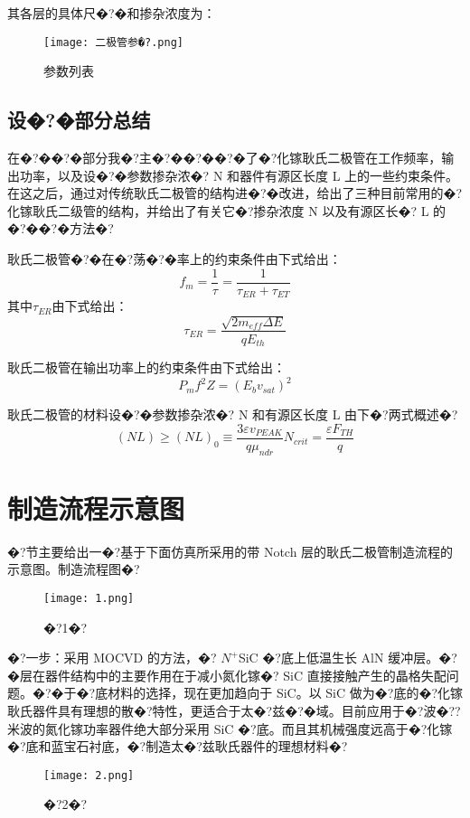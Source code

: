 \documentclass{zjureport}
\begin{document}
其各层的具体尺�?�和掺杂浓度为：
\begin{figure}[htbp]
	\centering
	\texttt{[image: 二极管参�?.png]}
	\caption{参数列表}
\end{figure}

\subsection{设�?�部分总结}
在�?��?�部分我�?主�?��?��?�了�?化镓耿氏二极管在工作频率，输出功率，以及设�?�参数掺杂浓�? N 和器件有源区长度 L 上的一些约束条件。在这之后，通过对传统耿氏二极管的结构进�?�改进，给出了三种目前常用的�?化镓耿氏二级管的结构，并给出了有关它�?掺杂浓度 N 以及有源区长�? L 的�?��?�方法�?

耿氏二极管�?�在�?荡�?�率上的约束条件由下式给出： 
\begin{equation}
	f_m=\frac{1}{\tau}=\frac{1}{\tau_{ER}+\tau_{ET}}
\end{equation}
其中$\tau_{ER}$由下式给出：
\begin{equation}
	\tau_{ER}=\frac{\sqrt{2m_{eff}\Delta E}}{qE_{th}}
\end{equation}

耿氏二极管在输出功率上的约束条件由下式给出：
\begin{equation}
	P_mf^2Z=(E_bv_{sat})^2
\end{equation}

耿氏二极管的材料设�?�参数掺杂浓�? N 和有源区长度 L 由下�?两式概述�?
\begin{equation}
	(NL)\geq(NL)_0\equiv \frac{3\varepsilon v_{PEAK}}{q\mu_{ndr}}
	N_{crit}=\frac{\varepsilon F_{TH}}{q}
\end{equation}
\section{制造流程示意图}
�?节主要给出一�?基于下面仿真所采用的带 Notch 层的耿氏二极管制造流程的示意图。制造流程图�?
\begin{figure}[htbp]
	\centering
	\texttt{[image: 1.png]}
	\caption{�?1�?}
\end{figure}

�?一步：采用 MOCVD 的方法，�? $N^+$SiC �?底上低温生长 AlN 缓冲层。�?�层在器件结构中的主要作用在于减小氮化镓�? SiC 直接接触产生的晶格失配问题。�?�于�?底材料的选择，现在更加趋向于 SiC。以 SiC 做为�?底的�?化镓耿氏器件具有理想的散�?特性，更适合于太�?兹�?�域。目前应用于�?波�??米波的氮化镓功率器件绝大部分采用 SiC �?底。而且其机械强度远高于�?化镓�?底和蓝宝石衬底，�?制造太�?兹耿氏器件的理想材料�?
\begin{figure}[htbp]
	\centering
	\texttt{[image: 2.png]}
	\caption{�?2�?}
\end{figure}
\end{document}
